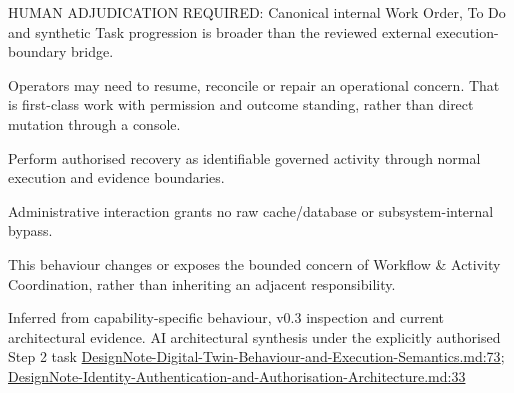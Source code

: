 HUMAN ADJUDICATION REQUIRED: Canonical internal Work Order, To Do and synthetic Task progression is broader than the reviewed external execution-boundary bridge.



Operators may need to resume, reconcile or repair an operational concern. That is first-class work with permission and outcome standing, rather than direct mutation through a console.



Perform authorised recovery as identifiable governed activity through normal execution and evidence boundaries.



Administrative interaction grants no raw cache/\allowbreak{}database or subsystem-internal bypass.



This behaviour changes or exposes the bounded concern of Workflow \& Activity Coordination, rather than inheriting an adjacent responsibility.


Inferred from capability-specific behaviour, v0.3 inspection and current architectural evidence. AI architectural synthesis under the explicitly authorised Step 2 task \hyperref[evidence:ec6250f7cf7c29a5]{DesignNote-Digital-Twin-Behaviour-and-Execution-Semantics.md:73}; \hyperref[evidence:13afd583ac468df7]{DesignNote-Identity-Authentication-and-Authorisation-Architecture.md:33}
